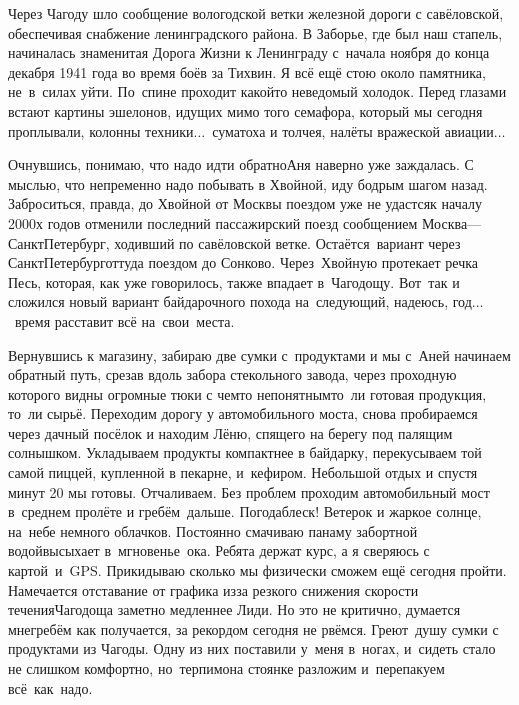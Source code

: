 Через Чагоду шло сообщение вологодской ветки железной дороги с савёловской, обеспечивая снабжение ленинградского района. В Заборье, где был наш стапель, начиналась знаменитая Дорога Жизни к Ленинграду с~начала ноября до конца декабря 1941 года во время боёв за Тихвин. Я всё ещё стою около памятника, не~в~силах уйти. По~спине проходит какой\sdash то неведомый холодок. Перед глазами встают картины эшелонов, идущих мимо того семафора, который мы сегодня проплывали, колонны техники$\ldots$~суматоха и толчея, налёты вражеской авиации$\ldots$  

Очнувшись, понимаю, что надо идти обратно\mdash Аня наверно уже заждалась. С мыслью, что непременно надо побывать в Хвойной, иду бодрым шагом назад. Заброситься, правда, до Хвойной от Москвы поездом уже не удастся\mdash к началу 2000\sdash х годов отменили последний пассажирский поезд сообщением Москва\thinspace\nobreakdash---\thinspace Санкт\sdash Петербург, ходивший по савёловской ветке. Остаётся~вариант через Санкт\sdash Петербург\mdash оттуда поездом до Сонково. Через~Хвойную протекает речка Песь, которая, как уже говорилось, также впадает в~Чагодощу. Вот~так и сложился новый вариант байдарочного похода на~следующий, надеюсь, год$\ldots$~время расставит всё на~свои~места.

Вернувшись к магазину, забираю две сумки с~продуктами и мы с~Аней начинаем обратный путь, срезав вдоль забора стекольного завода, через проходную которого видны огромные тюки с чем\sdash то непонятным\mdash то~ли готовая продукция, то~ли сырьё. Переходим дорогу у автомобильного моста, снова пробираемся через дачный посёлок и находим Лёню, спящего на берегу под палящим солнышком. Укладываем продукты компактнее в байдарку, перекусываем той самой пиццей, купленной в пекарне, и~кефиром. Небольшой отдых и спустя минут 20 мы готовы. Отчаливаем. Без проблем проходим автомобильный мост в~среднем пролёте и гребём~дальше. Погода\mdash блеск! Ветерок и жаркое солнце, на~небе немного облачков. 
\newpage
Постоянно смачиваю панаму забортной водой\mdash высыхает в~мгновенье~ока. Ребята держат курс, а я сверяюсь с картой~и~GPS. Прикидываю сколько мы физически сможем ещё сегодня пройти. Намечается отставание от графика из\sdash за резкого снижения скорости течения\mdash Чагодоща заметно медленнее Лиди. Но это не критично, думается мне\mdash гребём как получается, за рекордом сегодня не рвёмся. Греют~душу сумки с продуктами из Чагоды. Одну из них поставили у~меня в~ногах, и~сидеть стало не слишком комфортно, но~терпимо\mdash на стоянке разложим и~перепакуем всё~как~надо. 

